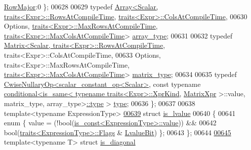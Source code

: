 \begin{DoxyCode}
{      \hyperlink{group__enums_ggaacded1a18ae58b0f554751f6cdf9eb13acfcde9cd8677c5f7caf6bd603666aae3}{RowMajor}:0 \};
00628 
00629   \textcolor{keyword}{typedef} \hyperlink{group___core___module_class_eigen_1_1_array}{Array<Scalar,  traits<Expr>::RowsAtCompileTime},   
      \hyperlink{struct_eigen_1_1internal_1_1traits}{traits<Expr>::ColsAtCompileTime},
00630                 Options, \hyperlink{struct_eigen_1_1internal_1_1traits}{traits<Expr>::MaxRowsAtCompileTime},
      \hyperlink{struct_eigen_1_1internal_1_1traits}{traits<Expr>::MaxColsAtCompileTime}> \hyperlink{group___core___module_class_eigen_1_1_array}{array\_type};
00631 
00632   \textcolor{keyword}{typedef} \hyperlink{group___core___module_class_eigen_1_1_matrix}{Matrix<Scalar,  traits<Expr>::RowsAtCompileTime},  
       traits<Expr>::ColsAtCompileTime,
00633                  Options, traits<Expr>::MaxRowsAtCompileTime,
      \hyperlink{struct_eigen_1_1internal_1_1traits}{traits<Expr>::MaxColsAtCompileTime}> 
      \hyperlink{group___core___module_class_eigen_1_1_matrix}{matrix\_type};
00634 
00635   \textcolor{keyword}{typedef} \hyperlink{group___core___module_class_eigen_1_1_cwise_nullary_op}{CwiseNullaryOp<scalar\_constant\_op<Scalar>}, \textcolor{keyword}{const} \textcolor{keyword}{
      typename} \hyperlink{struct_eigen_1_1internal_1_1conditional}{conditional<is\_same< typename traits<Expr>::XprKind}, 
      \hyperlink{struct_eigen_1_1_matrix_xpr}{MatrixXpr} >::value, matrix\_type, array\_type>\hyperlink{group___core___module_class_eigen_1_1_cwise_nullary_op}{::type} > \hyperlink{group___core___module_class_eigen_1_1_cwise_nullary_op}{type};
00636 \};
00637 
00638 \textcolor{keyword}{template}<\textcolor{keyword}{typename} ExpressionType>
\hyperlink{struct_eigen_1_1internal_1_1is__lvalue}{00639} \textcolor{keyword}{struct }\hyperlink{struct_eigen_1_1internal_1_1is__lvalue}{is\_lvalue}
00640 \{
00641   \textcolor{keyword}{enum} \{ value = (!bool(\hyperlink{struct_eigen_1_1internal_1_1is__const}{is\_const<ExpressionType>::value})) &&
00642                  \textcolor{keywordtype}{bool}(\hyperlink{struct_eigen_1_1internal_1_1traits}{traits<ExpressionType>::Flags} & 
      \hyperlink{group__flags_gae2c323957f20dfdc6cb8f44428eaec1a}{LvalueBit}) \};
00643 \};
00644 
\hyperlink{struct_eigen_1_1internal_1_1is__diagonal}{00645} \textcolor{keyword}{template}<\textcolor{keyword}{typename} T> \textcolor{keyword}{struct }\hyperlink{struct_eigen_1_1internal_1_1is__diagonal}{is\_diagonal}
}
\end{DoxyCode}
